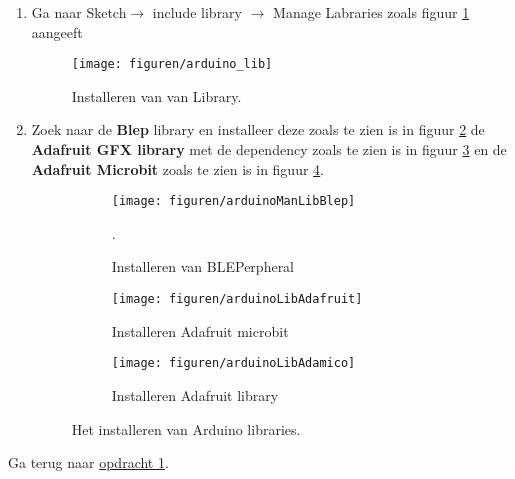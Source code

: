 \begin{enumerate}
	\item Ga naar Sketch$\rightarrow$ include library $\rightarrow$ Manage Labraries zoals figuur \ref{fig:ardLib} aangeeft
	
	   	\begin{figure}[h!]
		\captionsetup{justification=centering}
		\texttt{[image: figuren/arduino\_lib]}
		\centering
		\caption{Installeren van van Library.}
		\label{fig:ardLib}
	\end{figure}
	\item Zoek naar de \textbf{Blep} library en installeer deze zoals te zien is in figuur \ref{fig:ardlibBl} de \textbf{Adafruit GFX library}  met de  dependency zoals te zien is in figuur \ref{fig:ardlibAdaf} en de \textbf{Adafruit Microbit} zoals te zien is in figuur \ref{fig:ardlibMicro}.
	
\begin{figure}[h!]
	\centering
		\begin{center} 	
			\begin{subfigure}[b]{0.31\textwidth}
				\texttt{[image: figuren/arduinoManLibBlep]}
				\caption{Installeren van BLEPerpheral }.
				\label{fig:ardlibBl}
				
			\end{subfigure}
			\begin{subfigure}[b]{0.33\textwidth}
				\texttt{[image: figuren/arduinoLibAdafruit]}
				\caption{Installeren Adafruit microbit }
				\label{fig:ardlibAdaf}
			\end{subfigure}
			\begin{subfigure}[b]{0.33\textwidth}
	\texttt{[image: figuren/arduinoLibAdamico]}
	\caption{Installeren Adafruit library }
	\label{fig:ardlibMicro}
\end{subfigure}			
			\captionsetup{justification=centering}
			\caption{Het installeren van Arduino libraries. }
			\label{fig:ardInstal}
		\end{center}
		
	\end{figure}
	
	
\end{enumerate}

Ga terug naar \hyperref[chap:tweeVerv] {opdracht 1}.